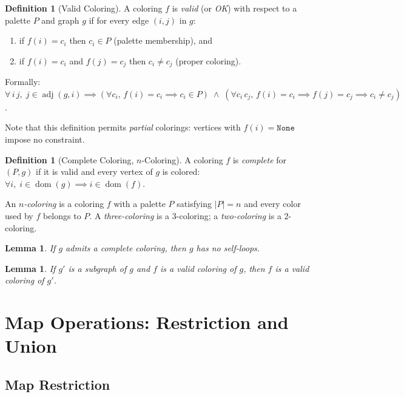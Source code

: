 \documentclass[11pt]{article}
\theoremstyle{plain}
\newtheorem{lemma}[theorem]{Lemma}
\theoremstyle{definition}
\newtheorem{definition}[theorem]{Definition}
\theoremstyle{remark}
\newcommand{\adj}{\operatorname{adj}}
\begin{document}
\begin{definition}[Valid Coloring]
A coloring $f$ is \emph{valid} (or \emph{OK}) with respect to a palette $P$ and graph $g$ if for every edge $(i,j)$ in $g$:
\begin{enumerate}[nosep]
  \item if $f(i) = c_i$ then $c_i \in P$ (palette membership), and
  \item if $f(i) = c_i$ and $f(j) = c_j$ then $c_i \neq c_j$ (proper coloring).
\end{enumerate}
Formally: $\forall\, i\, j,\; j \in \adj(g,i) \implies (\forall c_i,\, f(i) = c_i \implies c_i \in P) \;\wedge\; (\forall c_i\, c_j,\, f(i)=c_i \implies f(j)=c_j \implies c_i \neq c_j)$.
\end{definition}

Note that this definition permits \emph{partial} colorings: vertices with $f(i) = \texttt{None}$ impose no constraint.

\begin{definition}[Complete Coloring, $n$-Coloring]
A coloring $f$ is \emph{complete} for $(P, g)$ if it is valid and every vertex of $g$ is colored: $\forall i,\; i \in \operatorname{dom}(g) \implies i \in \operatorname{dom}(f)$.

An \emph{$n$-coloring} is a coloring $f$ with a palette $P$ satisfying $|P| = n$ and every color used by $f$ belongs to $P$.
A \emph{three-coloring} is a 3-coloring; a \emph{two-coloring} is a 2-coloring.
\end{definition}

\begin{lemma}
\label{lem:complete-no-selfloop}
If $g$ admits a complete coloring, then $g$ has no self-loops.
\end{lemma}

\begin{lemma}
\label{lem:subgraph-coloring}
If $g'$ is a subgraph of $g$ and $f$ is a valid coloring of $g$, then $f$ is a valid coloring of $g'$.
\end{lemma}

\section{Map Operations: Restriction and Union}
\label{sec:map-ops}

\subsection{Map Restriction}
\end{document}
